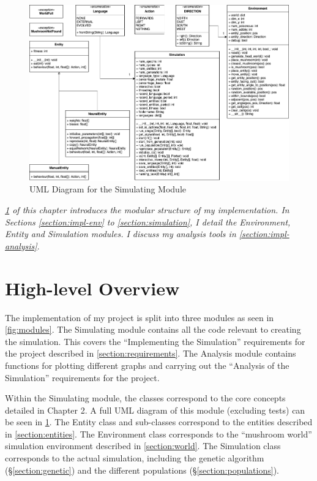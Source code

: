 \documentclass[12pt,a4paper]{report}
\begin{document}
\begin{figure}[p]
  \centering
  \includegraphics[angle=90, width=.9\linewidth]{figs/uml}
  \caption{UML Diagram for the Simulating Module}
  \label{fig:uml}
\end{figure}


\emph{\cref{section:impl-high} of this chapter introduces the modular structure of my implementation. In Sections \ref{section:impl-env} to \ref{section:simulation}, I detail the Environment, Entity and Simulation modules. I discuss my analysis tools in \cref{section:impl-analysis}}.

\section{High-level Overview}\label{section:impl-high}

The implementation of my project is split into three modules as seen in \cref{fig:modules}. The Simulating module contains all the code relevant to creating the simulation. This covers the ``Implementing the Simulation'' requirements for the project described in \cref{section:requirements}. The Analysis module contains functions for plotting different graphs and carrying out the ``Analysis of the Simulation'' requirements for the project.

Within the Simulating module, the classes correspond to the core concepts detailed in Chapter 2. A full UML diagram of this module (excluding tests) can be seen in \cref{fig:uml}. The Entity class and sub-classes correspond to the entities described in \cref{section:entities}. The Environment class corresponds to the ``mushroom world'' simulation environment described in \cref{section:world}. The Simulation class corresponds to the actual simulation, including the genetic algorithm (\S\ref{section:genetic}) and the different populations (\S\ref{section:populations}).
\end{document}
